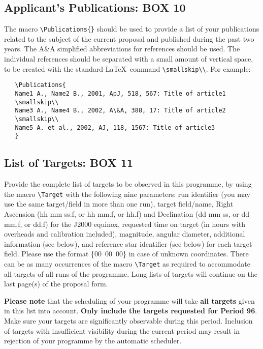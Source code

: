 \documentclass{article}
\begin{document}
\subsection{Applicant's  Publications: {\bf BOX 10}}

The macro \verb|\Publications{}| should be used to 
provide a list of your publications related to the
subject of the current proposal and published during the past two
years. The A\&A simplified abbreviations for references should be
used. The individual references should be separated with a small
amount of vertical space, to be created with the standard \LaTeX\
command \verb|\smallskip\\|. For example:
\begin{verbatim}
   \Publications{
   Name1 A., Name2 B., 2001, ApJ, 518, 567: Title of article1
   \smallskip\\
   Name3 A., Name4 B., 2002, A\&A, 388, 17: Title of article2
   \smallskip\\
   Name5 A. et al., 2002, AJ, 118, 1567: Title of article3
   }
\end{verbatim}

\subsection{List of Targets: {\bf BOX 11}}
  
Provide the complete list of targets to be observed in this programme,
by using the macro \verb|\Target| 
with the following nine parameters: run identifier (you may use the same
target/field in more than one run), target field/name, Right Ascension
(hh mm ss.f, or hh mm.f, or hh.f) and Declination (dd mm ss, or dd
mm.f, or dd.f) for the 
J2000 equinox, requested time on target (in hours
with overheads and calibration included), magnitude, angular diameter,
additional information (see below), and reference star identifier
(see below)
for each target field.  Please use the format \{00~00~00\}
in case of unknown coordinates. There can be as many occurrences of
the macro \verb|\Target| as required to accommodate all targets of all
runs of the programme. Long lists of targets will continue
on the last page(s) of the proposal form.

{\bf Please note} that the scheduling of your programme will take
{\bf all targets} given in this list into account. {\bf Only include
 the targets requested for Period 96}.
Make sure your targets
are significantly observable during this period.  Inclusion of targets
with insufficient visibility during the current period may result in
rejection of your programme by the automatic scheduler.
\end{document}
